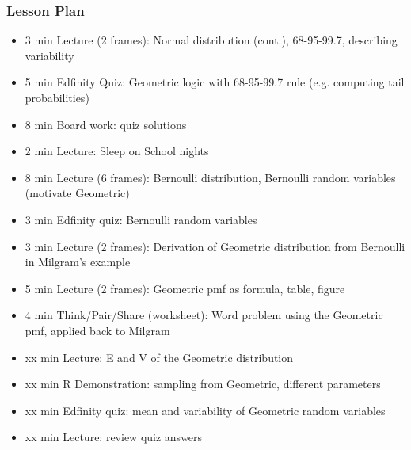 \begin{frame}
    \frametitle{Lesson Plan}
    \begin{itemize}
        \item 3 min Lecture (2 frames): Normal distribution (cont.), 68-95-99.7, describing variability
        \item 5 min Edfinity Quiz: Geometric logic with 68-95-99.7 rule (e.g. computing tail probabilities)
        \item 8 min Board work: quiz solutions
        \item 2 min Lecture: Sleep on School nights

        \item 8 min Lecture (6 frames): Bernoulli distribution, Bernoulli random variables (motivate Geometric)
        \item 3 min Edfinity quiz: Bernoulli random variables
        \item 3 min Lecture (2 frames): Derivation of Geometric distribution from Bernoulli in Milgram's example
        \item 5 min Lecture (2 frames): Geometric pmf as formula, table, figure
        \item 4 min Think/Pair/Share (worksheet): Word problem using the Geometric pmf, applied back to Milgram
        
        \item xx min Lecture: E and V of the Geometric distribution
        \item xx min R Demonstration: sampling from Geometric, different parameters
        \item xx min Edfinity quiz: mean and variability of Geometric random variables
        \item xx min Lecture: review quiz answers
    \end{itemize}
\end{frame}


